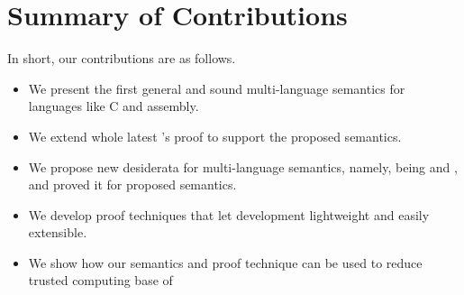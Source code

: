 {%









\section{Summary of Contributions}\label{sec:introduction:summary}

In short, our contributions are as follows.
\begin{itemize}
  \item We present the first general and sound multi-language semantics for languages like C and assembly.
  \item We extend whole latest \cc{}'s proof to support the proposed semantics.
  \item We propose new desiderata for multi-language semantics, namely, being \lbound{} and \ubound{}, and proved it for proposed semantics.
  \item We develop proof techniques that let development lightweight and easily extensible.
  \item We show how our semantics and proof technique can be used to reduce trusted computing base of \cc{}
\end{itemize}

}
